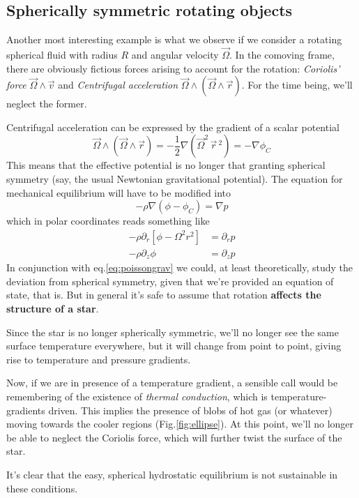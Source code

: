 \subsection*{Spherically symmetric rotating objects}
\par Another most interesting example is what we observe if we consider a rotating spherical fluid with radius $R$ and angular velocity $\vec{\Omega}$. In the comoving frame, there are obviously fictious forces arising to account for the rotation: \emph{Coriolis' force} $\vec{\Omega} \wedge \vec{v}$ and \emph{Centrifugal acceleration} $\vec{\Omega}\wedge(\vec{\Omega}\wedge\vec{r})$. For the time being, we'll neglect the former.
\par Centrifugal acceleration can be expressed by the gradient of a scalar potential
\begin{equation}
    \vec{\Omega}\wedge(\vec{\Omega}\wedge\vec{r}) = -\frac{1}{2}\nabla(\vec{\Omega}^{2}\,\vec{r}\,^{2}) = -\nabla \phi_{C}
    \label{eq:scalarcentrifugal}
\end{equation}
This means that the effective potential is no longer that granting spherical symmetry (say, the usual Newtonian gravitational potential). The equation for mechanical equilibrium will have to be modified into 
\begin{equation*}
    -\rho\nabla(\phi-\phi_{C}) = \nabla p
\end{equation*}
which in polar coordinates reads something like
\begin{align}
    -\rho\partial_{r}\left[\phi-\Omega^{2}r^{2}\right] &= \partial_{r} p\\
    -\rho\partial_{z}\phi &= \partial_{z}p
\end{align}
In conjunction with eq.\ref{eq:poissongrav} we could, at least theoretically, study the deviation from spherical symmetry, given that we're provided an equation of state, that is. But in general it's safe to assume that rotation \textbf{affects the structure of a star}.

Since the star is no longer spherically symmetric, we'll no longer see the same surface temperature everywhere, but it will change from point to point, giving rise to temperature and pressure gradients.
\par Now, if we are in presence of a temperature gradient, a sensible call would be remembering of the existence of \emph{thermal conduction}, which is temperature-gradients driven. This implies the presence of blobs of hot gas (or whatever) moving towards the cooler regions (Fig.\ref{fig:ellipse}). At this point, we'll no longer be able to neglect the Coriolis force, which will further twist the surface of the star.
\par It's clear that the easy, spherical hydrostatic equilibrium is not sustainable in these conditions.
